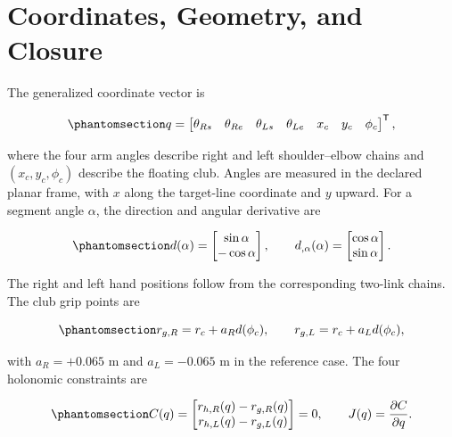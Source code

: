 \documentclass[
  letterpaper,
]{report}
\begin{document}
\section{Coordinates, Geometry, and
Closure}\label{sec-forward-two-hand-geometry}

The generalized coordinate vector is

\begin{equation}\phantomsection\label{eq-forward-two-hand-q}{
q =
\begin{bmatrix}
\theta_{Rs} & \theta_{Re} & \theta_{Ls} & \theta_{Le} & x_c & y_c & \phi_c
\end{bmatrix}^{\mathsf T},
}\end{equation}

where the four arm angles describe right and left shoulder--elbow chains
and \((x_c,y_c,\phi_c)\) describe the floating club. Angles are measured
in the declared planar frame, with \(x\) along the target-line
coordinate and \(y\) upward. For a segment angle \(\alpha\), the
direction and angular derivative are

\begin{equation}\phantomsection\label{eq-forward-two-hand-direction}{
d(\alpha)=
\begin{bmatrix}\sin\alpha\\-\cos\alpha\end{bmatrix},
\qquad
d_{,\alpha}(\alpha)=
\begin{bmatrix}\cos\alpha\\\sin\alpha\end{bmatrix}.
}\end{equation}

The right and left hand positions follow from the corresponding two-link
chains. The club grip points are

\begin{equation}\phantomsection\label{eq-forward-two-hand-grips}{
r_{g,R}=r_c+a_R d(\phi_c),
\qquad
r_{g,L}=r_c+a_L d(\phi_c),
}\end{equation}

with \(a_R=+0.065\) m and \(a_L=-0.065\) m in the reference case. The
four holonomic constraints are

\begin{equation}\phantomsection\label{eq-forward-two-hand-constraints}{
C(q)=
\begin{bmatrix}
r_{h,R}(q)-r_{g,R}(q)\\
r_{h,L}(q)-r_{g,L}(q)
\end{bmatrix}=0,
\qquad
J(q)=\frac{\partial C}{\partial q}.
}\end{equation}
\end{document}
